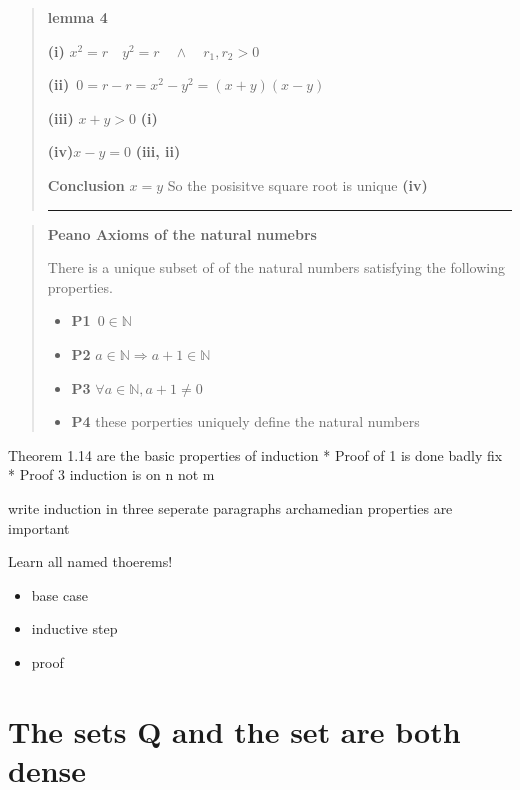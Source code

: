 \documentclass{tufte-book}
\providecommand{\tightlist}{%
  \setlength{\itemsep}{0pt}\setlength{\parskip}{0pt}}
\begin{document}
\begin{quote}
\textbf{lemma 4}

\textbf{(i)} \(x^2 = r \quad y^2 = r \quad \wedge \quad r_1, r_2 > 0\)

\textbf{(ii)} \(\, 0 = r - r = x^2 - y^2 = (x+y)(x-y)\)

\textbf{(iii)} \(x + y >0\) \textbf{(i)}

\textbf{(iv)}\(x-y = 0\) \textbf{(iii, ii)}

\textbf{Conclusion} \(x=y\) So the posisitve square root is unique
\textbf{(iv)}

\begin{center}\rule{0.5\linewidth}{\linethickness}\end{center}
\end{quote}\begin{quote}
\textbf{Peano Axioms of the natural numebrs}

There is a unique subset of of the natural numbers satisfying the
following properties.

\begin{itemize}
\tightlist
\item
  \textbf{P1} \(\,0 \in \mathbb{N}\)
\item
  \textbf{P2} \(a \in \mathbb{N} \Rightarrow a+1 \in \mathbb{N}\)
\item
  \textbf{P3} \(\forall a \in \mathbb{N}, a+1 \neq{0}\)
\item
  \textbf{P4} these porperties uniquely define the natural numbers
\end{itemize}
\end{quote}

Theorem 1.14 are the basic properties of induction * Proof of 1 is done
badly fix * Proof 3 induction is on n not m

write induction in three seperate paragraphs archamedian properties are
important

Learn all named thoerems!

\begin{itemize}
\tightlist
\item
  base case
\item
  inductive step
\item
  proof
\end{itemize}

\hypertarget{the-sets-q-and-the-set-are-both-dense}{%
\section{\texorpdfstring{The sets \mathbb Q and the set
\mathbb[Q] are both
dense}{The sets Q and the set are both dense}}\label{the-sets-q-and-the-set-are-both-dense}}
\end{document}
